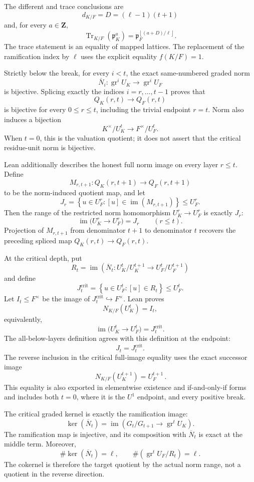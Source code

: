 \begin{theorem}
The different and trace conclusions are
\[
 d_{K/F}=D=(\ell-1)(t+1)
\]
and, for every $a\in\mathbf Z$,
\[
 \operatorname{Tr}_{K/F}(\mathfrak p_K^a)
 =
 \mathfrak p_F^{\left\lfloor(a+D)/\ell\right\rfloor}.
\]
The trace statement is an equality of mapped lattices.  The replacement of
the ramification index by $\ell$ uses the explicit equality $f(K/F)=1$.

Strictly below the break, for every $i<t$, the exact same-numbered graded
norm
\[
 \overline N_i:
 \operatorname{gr}^iU_K\longrightarrow\operatorname{gr}^iU_F
\]
is bijective.  Splicing exactly the indices $i=r,\ldots,t-1$ proves that
\[
 Q_K(r,t)\longrightarrow Q_F(r,t)
\]
is bijective for every $0\le r\le t$, including the trivial endpoint
$r=t$.  Norm also induces a bijection
\[
 K^\times/U_K^t\longrightarrow F^\times/U_F^t.
\]
When $t=0$, this is the valuation quotient; it does not assert that the
critical residue-unit norm is bijective.

Lean additionally describes the honest full norm image on every layer
$r\le t$.  Define
\[
 M_{r,t+1}:Q_K(r,t+1)\longrightarrow Q_F(r,t+1)
\]
to be the norm-induced quotient map, and let
\[
 J_r=
 \left\{
 u\in U_F^r:
 [u]\in\operatorname{im}(M_{r,t+1})
 \right\}
 \le U_F^r.
\]
Then the range of the restricted norm homomorphism
$U_K^r\to U_F^r$ is exactly $J_r$:
\[
 \operatorname{im}\bigl(U_K^r\longrightarrow U_F^r\bigr)=J_r
 \qquad(r\le t).
\]
Projection of $M_{r,t+1}$ from denominator $t+1$ to denominator $t$
recovers the preceding spliced map
$Q_K(r,t)\to Q_F(r,t)$.

At the critical depth, put
\[
 R_t=\operatorname{im}\left(
 \overline N_t:
 U_K^t/U_K^{t+1}\longrightarrow U_F^t/U_F^{t+1}
 \right)
\]
and define
\[
 J_t^{\mathrm{crit}}
 =
 \left\{
 u\in U_F^t:[u]\in R_t
 \right\}
 \le U_F^t.
\]
Let $I_t\le F^\times$ be the image of
$J_t^{\mathrm{crit}}\hookrightarrow F^\times$.  Lean proves
\[
 N_{K/F}(U_K^t)=I_t,
\]
equivalently,
\[
 \operatorname{im}\bigl(U_K^t\longrightarrow U_F^t\bigr)
 =J_t^{\mathrm{crit}}.
\]
The all-below-layers definition agrees with this definition at the endpoint:
\[
 J_t=J_t^{\mathrm{crit}}.
\]
The reverse inclusion in the critical full-image equality uses the exact
successor image
\[
 \boxed{\,N_{K/F}(U_K^{t+1})=U_F^{t+1}\,}.
\]
This equality is also exported in elementwise existence and if-and-only-if
forms and includes both $t=0$, where it is the $U^1$ endpoint, and every
positive break.

The critical graded kernel is exactly the ramification image:
\[
 \ker(\overline N_t)
 =
 \operatorname{im}\left(
 G_t/G_{t+1}\longrightarrow\operatorname{gr}^tU_K
 \right).
\]
The ramification map is injective, and its composition with
$\overline N_t$ is exact at the middle term.  Moreover,
\[
 \#\ker(\overline N_t)=\ell,
 \qquad
 \#\left(
 \operatorname{gr}^tU_F/R_t
 \right)=\ell.
\]
The cokernel is therefore the target quotient by the actual norm range,
not a quotient in the reverse direction.


\end{theorem}
